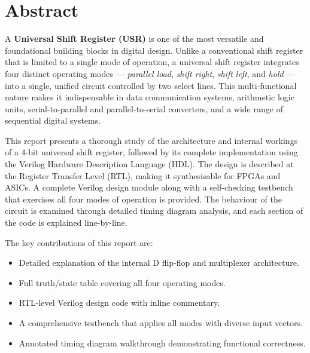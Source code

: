 \documentclass[12pt,a4paper]{report}
\begin{document}
\chapter*{Abstract}

A \textbf{Universal Shift Register (USR)} is one of the most versatile and foundational building blocks in digital design. Unlike a conventional shift register that is limited to a single mode of operation, a universal shift register integrates four distinct operating modes — \textit{parallel load}, \textit{shift right}, \textit{shift left}, and \textit{hold} — into a single, unified circuit controlled by two select lines. This multi-functional nature makes it indispensable in data communication systems, arithmetic logic units, serial-to-parallel and parallel-to-serial converters, and a wide range of sequential digital systems.

This report presents a thorough study of the architecture and internal workings of a 4-bit universal shift register, followed by its complete implementation using the Verilog Hardware Description Language (HDL). The design is described at the Register Transfer Level (RTL), making it synthesisable for FPGAs and ASICs. A complete Verilog design module along with a self-checking testbench that exercises all four modes of operation is provided. The behaviour of the circuit is examined through detailed timing diagram analysis, and each section of the code is explained line-by-line.

The key contributions of this report are:
\begin{itemize}[leftmargin=2em]
    \item Detailed explanation of the internal D flip-flop and multiplexer architecture.
    \item Full truth/state table covering all four operating modes.
    \item RTL-level Verilog design code with inline commentary.
    \item A comprehensive testbench that applies all modes with diverse input vectors.
    \item Annotated timing diagram walkthrough demonstrating functional correctness.
\end{itemize}

\newpage

\tableofcontents
\newpage
\listoffigures
\listoftables
\newpage
\end{document}
